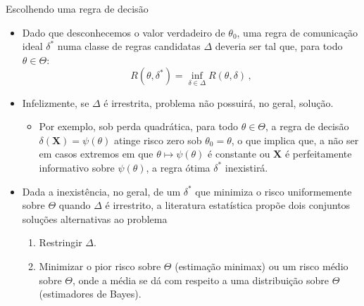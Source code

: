 \documentclass[11pt]{beamer}
\begin{document}
	
	\begin{frame}{Escolhendo uma regra de decisão}
		\begin{itemize}
			\item Dado que desconhecemos o valor verdadeiro de $\theta_0$, uma regra de comunicação ideal $\delta^*$ numa classe de regras candidatas $\Delta$ deveria ser tal que, para todo $\theta \in \Theta$:
			$$R(\theta,\delta^*) = \inf_{\delta \in \Delta}R(\theta,\delta)\, ,$$
			\item Infelizmente, se $\Delta$ é irrestrita, problema não possuirá, no geral, solução.
			\begin{itemize}
				\item Por exemplo, sob perda quadrática, para todo $\theta \in \Theta$, a regra de decisão $\delta(\boldsymbol{X}) = \psi(\theta)$ atinge risco zero sob $\theta_0=\theta$, o que implica que, a não ser em casos extremos em que $\theta \mapsto \psi(\theta)$ é constante ou $\boldsymbol{X}$ é perfeitamente informativo sobre $\psi(\theta)$, a regra ótima $\delta^*$ inexistirá.
			\end{itemize}
			\item Dada a inexistência, no geral, de um $\delta^*$ que minimiza o risco uniformemente sobre $\Theta$ quando $\Delta$ é irrestrito, a literatura estatística propõe dois conjuntos soluções alternativas ao problema
			\begin{enumerate}
				\item Restringir $\Delta$.
				\item Minimizar o pior risco sobre $\Theta$ (estimação minimax) ou um risco médio sobre $\Theta$, onde a média se dá com respeito a uma distribuição sobre $\Theta$ (estimadores de Bayes). 
			\end{enumerate}
		\end{itemize}
	\end{frame}
\end{document}
